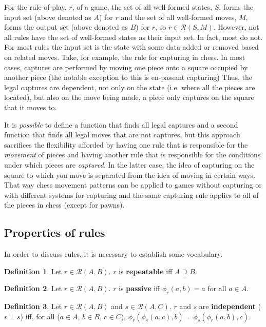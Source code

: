 \documentclass{article}
\theoremstyle{definition}
\newtheorem{definition}{Definition}[subsection]
\theoremstyle{plain}
\def\rule{\mathcal{R}}
\begin{document}
For the rule-of-play, $ r $, of a game,
the set of all well-formed states, $ S $, forms the input set (above denoted as $ A $) for $ r $
and the set of all well-formed moves, $ M $, forms the output set (above denoted as $ B $) for $ r $,
so $ r \in \rule (S, M) $.
However, not all rules have the set of well-formed states as their input set.
In fact, most do not.
For most rules the input set is the state with some data added or removed based on related moves.
Take, for example, the rule for capturing in chess.
In most cases, captures are performed by moving one piece onto a square occupied by another piece
(the notable exception to this is en-passant capturing)
Thus, the legal captures are dependent, not only on the state (i.e. where all the pieces are located),
but also on the move being made, a piece only captures on the square that it moves to.

It is \emph{possible} to define a function that finds all legal captures
and a second function that finds all legal moves that are not captures,
but this approach sacrifices the flexibility afforded by having
one rule that is responsible for the \emph{movement} of pieces
and having another rule that is responsible for the conditions under which pieces are \emph{captured}.
In the latter case, the idea of capturing on the square to which you move is separated from the idea of moving in certain ways.
That way chess movement patterns can be applied to games without capturing or with different systems for capturing
and the same capturing rule applies to all of the pieces in chess (except for pawns).

\subsection{Properties of rules}

In order to discuss rules,
it is necessary to establish some vocabulary.

\begin{definition}
  Let $ r \in \rule (A, B) $. $ r $ is \textbf{repeatable} iff $ A \supseteq B $.
\end{definition}

\begin{definition}
  Let $ r \in \rule (A, B) $. $ r $ is \textbf{passive} iff $ \phi_r (a, b) = a $ for all $ a \in A$.
\end{definition}

\begin{definition}
  Let $ r \in \rule (A, B) $
  and $ s \in \rule (A, C) $.
  $r$ and $s$ are \textbf{independent} ($ r \perp s $) iff,
  for all ($ a \in A $, $ b \in B $, $ c \in C $),
  $ \phi_r (\phi_s (a, c), b) = \phi_s (\phi_r (a, b), c) $. 
\end{definition}
\end{document}
